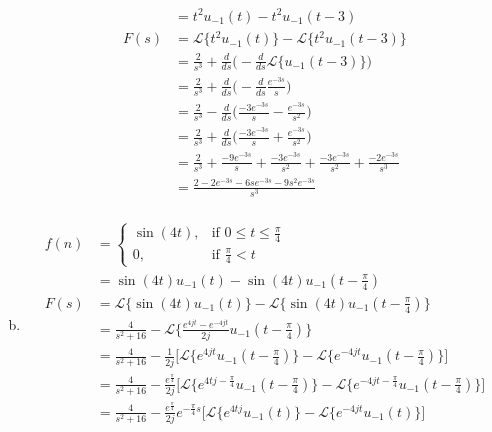 \documentclass[12pt]{article}
\begin{document}
\begin{enumerate}[a)]
\begin{align*}
            &= t^2u_{-1}(t) - t^2u_{-1}(t-3)\\
            F(s) &= \mathcal{L} \{ t^2u_{-1}(t)\} - \mathcal{L}\{t^2u_{-1}(t-3)\}\\
                &=\frac{2}{s^3} + \frac{d}{ds} \bigg( -\frac{d}{ds} \mathcal{L}\{ u_{-1}(t-3)\} \bigg)\\
                &=\frac{2}{s^3} + \frac{d}{ds} \bigg( -\frac{d}{ds} \frac{e^{-3s}}{s} \bigg)\\
                &=\frac{2}{s^3} - \frac{d}{ds} \bigg( \frac{-3e^{-3s}}{s} - \frac{e^{-3s}}{s^2} \bigg)\\
                &=\frac{2}{s^3} + \frac{d}{ds} \bigg( \frac{-3e^{-3s}}{s} + \frac{e^{-3s}}{s^2} \bigg)\\
                &=\frac{2}{s^3} + \frac{-9e^{-3s}}{s} + \frac{-3e^{-3s}}{s^2} + \frac{-3e^{-3s}}{s^2} + \frac{-2e^{-3s}}{s^3}\\
                &= \frac{2-2e^{-3s} -6se^{-3s} - 9s^2e^{-3s}}{s^3}  \\
        \end{align*}
    \item
        \begin{align*}
            f(n) &=
                \begin{cases}
                \sin(4t), & \text{if }0 \leq t \leq \frac{\pi}{4} \\
                0, & \text{if }\frac{\pi}{4} < t
                \end{cases}\\
            &= \sin(4t)u_{-1}(t) - \sin(4t)u_{-1}(t- \frac{\pi}{4})\\
            F(s) &= \mathcal{L} \{\sin(4t)u_{-1}(t)\} - \mathcal{L} \{\sin(4t)u_{-1}(t- \frac{\pi}{4})\}\\
                &=\frac{4}{s^2 + 16} - \mathcal{L} \bigg \{  \frac{e^{4jt} - e^{-4jt}}{2j} u_{-1}(t- \frac{\pi}{4}) \bigg\}\\
                &=\frac{4}{s^2 + 16} - \frac{1}{2j} \bigg[\mathcal{L} \{ e^{4jt}u_{-1}(t- \frac{\pi}{4})\} - \mathcal{L} \{e^{-4jt} u_{-1}(t- \frac{\pi}{4}) \}\bigg]\\
                &=\frac{4}{s^2 + 16} - \frac{e^{\frac{\pi}{4}}}{2j} \bigg[\mathcal{L} \bigg\{ e^{4tj-\frac{\pi}{4}}u_{-1}(t- \frac{\pi}{4})\bigg\} - \mathcal{L} \bigg\{e^{-4jt-\frac{\pi}{4}} u_{-1}(t- \frac{\pi}{4}) \bigg\}\bigg]\\
                &=\frac{4}{s^2 + 16} - \frac{e^{\frac{\pi}{4}}}{2j} e^{-\frac{\pi}{4}s} \bigg[\mathcal{L} \bigg\{ e^{4tj}u_{-1}(t)\bigg\} - \mathcal{L} \bigg\{e^{-4jt} u_{-1}(t) \bigg\}\bigg]\\

\end{align*}
\end{enumerate}
\end{document}
